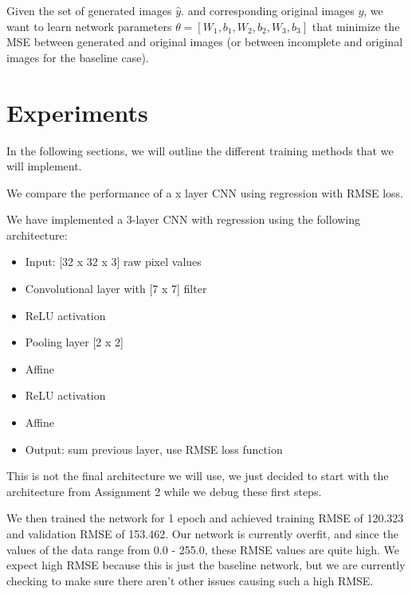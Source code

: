 \documentclass[10pt,twocolumn,letterpaper]{article}
\begin{document}
Given the set of generated images $\hat{y}$. and corresponding original images $y$, we want to learn network parameters  $ \theta = [W_1, b_1, W_2, b_2, W_3, b_3]$ that minimize the MSE between generated and original images (or between incomplete and original images for the baseline case). 

\section{Experiments} 
In the following sections, we will outline the different training methods that we will implement. 

We compare the performance of a x layer CNN using regression with RMSE loss.


We have implemented a 3-layer CNN with regression using the following architecture: 

\begin{itemize}
\item Input: [32 x 32 x 3] raw pixel values
\item Convolutional layer with [7 x 7] filter
\item ReLU activation
\item Pooling layer [2 x 2]
\item Affine
\item ReLU activation
\item Affine
\item Output: sum previous layer, use RMSE loss function
\end{itemize}

This is not the final architecture we will use, we just decided to start with the architecture from Assignment 2 while we debug these first steps. 

We then trained the network for 1 epoch and achieved training RMSE of 120.323 and validation RMSE of 153.462. Our network is currently overfit, and since the values of the data range from 0.0 - 255.0, these RMSE values are quite high. We expect high RMSE because this is just the baseline network, but we are currently checking to make sure there aren't other issues causing such a high RMSE.
\end{document}
